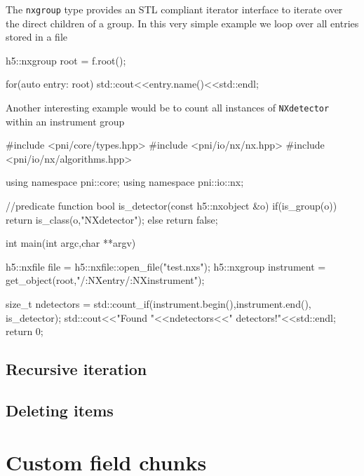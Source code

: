 The {\tt nxgroup} type provides an STL compliant iterator interface to iterate
over the direct children of a group. In this very simple example we loop over 
all entries stored in a file
\begin{cppcode}
h5::nxgroup root = f.root();

for(auto entry: root)
    std::cout<<entry.name()<<std::endl;
\end{cppcode}
Another interesting example would be to count all instances of {\tt NXdetector} 
within an instrument group
\begin{cppcode}
#include <pni/core/types.hpp>
#include <pni/io/nx/nx.hpp>
#include <pni/io/nx/algorithms.hpp>

using namespace pni::core;
using namespace pni::io::nx;

//predicate function
bool is_detector(const h5::nxobject &o)
{
    if(is_group(o)) return is_class(o,"NXdetector");
    else return false;
}

int main(int argc,char **argv)
{
    h5::nxfile file = h5::nxfile::open_file("test.nxs");
    h5::nxgroup instrument = get_object(root,"/:NXentry/:NXinstrument");

    size_t ndetectors = std::count_if(instrument.begin(),instrument.end(),
                                      is_detector);
    std::cout<<"Found "<<ndetectors<<" detectors!"<<std::endl;
    return 0;
}
\end{cppcode}

\subsection{Recursive iteration}

\subsection{Deleting items}


\section{Custom field chunks}\label{section:field_chunks}



